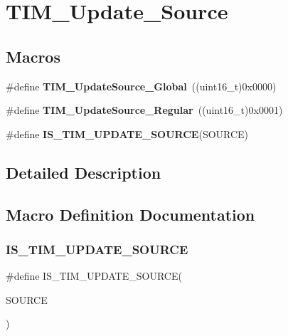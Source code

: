 \section{T\+I\+M\+\_\+\+Update\+\_\+\+Source}
\label{group__TIM__Update__Source}
\subsection*{Macros}
\begin{DoxyCompactItemize}
\item 
\#define \textbf{ T\+I\+M\+\_\+\+Update\+Source\+\_\+\+Global}~((uint16\+\_\+t)0x0000)
\item 
\#define \textbf{ T\+I\+M\+\_\+\+Update\+Source\+\_\+\+Regular}~((uint16\+\_\+t)0x0001)
\item 
\#define \textbf{ I\+S\+\_\+\+T\+I\+M\+\_\+\+U\+P\+D\+A\+T\+E\+\_\+\+S\+O\+U\+R\+CE}(S\+O\+U\+R\+CE)
\end{DoxyCompactItemize}


\subsection{Detailed Description}


\subsection{Macro Definition Documentation}
\mbox{\label{group__TIM__Update__Source_ga7c916798d8f5f4a828afadceb5d38a95}} 
\subsubsection{I\+S\+\_\+\+T\+I\+M\+\_\+\+U\+P\+D\+A\+T\+E\+\_\+\+S\+O\+U\+R\+CE}
{\footnotesize\ttfamily \#define I\+S\+\_\+\+T\+I\+M\+\_\+\+U\+P\+D\+A\+T\+E\+\_\+\+S\+O\+U\+R\+CE(\begin{DoxyParamCaption}\item[{}]{S\+O\+U\+R\+CE }\end{DoxyParamCaption})}

